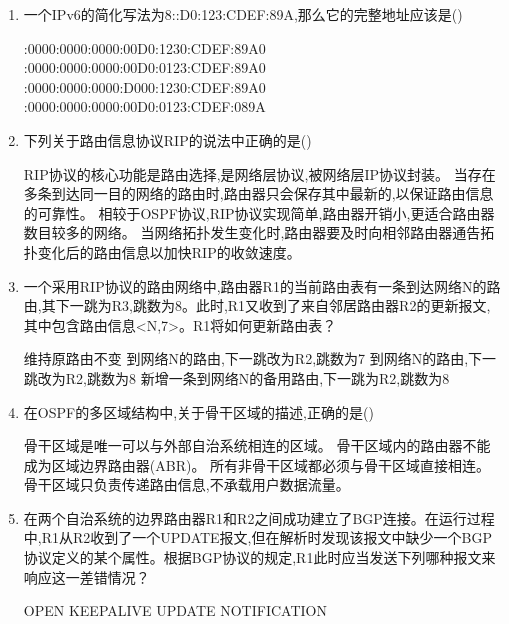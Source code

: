 \documentclass[12pt, a4paper, oneside, UTF8]{ctexbook}
\begin{document}
\begin{enumerate}
    \item 一个IPv6的简化写法为8::D0:123:CDEF:89A,那么它的完整地址应该是()
    \begin{choices}[1]
    :0000:0000:0000:00D0:1230:CDEF:89A0
    :0000:0000:0000:00D0:0123:CDEF:89A0
    :0000:0000:0000:D000:1230:CDEF:89A0
    :0000:0000:0000:00D0:0123:CDEF:089A
    \end{choices}

    \item 下列关于路由信息协议RIP的说法中正确的是(\qquad)
    \begin{choices}[1]
    \task RIP协议的核心功能是路由选择,是网络层协议,被网络层IP协议封装。
    \task 当存在多条到达同一目的网络的路由时,路由器只会保存其中最新的,以保证路由信息的可靠性。
    \task 相较于OSPF协议,RIP协议实现简单,路由器开销小,更适合路由器数目较多的网络。
    \task 当网络拓扑发生变化时,路由器要及时向相邻路由器通告拓扑变化后的路由信息以加快RIP的收敛速度。
    \end{choices}

    \item 一个采用RIP协议的路由网络中,路由器R1的当前路由表有一条到达网络N的路由,其下一跳为R3,跳数为8。此时,R1又收到了来自邻居路由器R2的更新报文,其中包含路由信息<N,7>。R1将如何更新路由表？
    \begin{choices}[1]
    \task 维持原路由不变
    \task 到网络N的路由,下一跳改为R2,跳数为7
    \task 到网络N的路由,下一跳改为R2,跳数为8
    \task 新增一条到网络N的备用路由,下一跳为R2,跳数为8
    \end{choices}

    \item 在OSPF的多区域结构中,关于骨干区域的描述,正确的是(\qquad)
    \begin{choices}[1]
    \task 骨干区域是唯一可以与外部自治系统相连的区域。
    \task 骨干区域内的路由器不能成为区域边界路由器(ABR)。
    \task 所有非骨干区域都必须与骨干区域直接相连。
    \task 骨干区域只负责传递路由信息,不承载用户数据流量。
    \end{choices}

    \item 在两个自治系统的边界路由器R1和R2之间成功建立了BGP连接。在运行过程中,R1从R2收到了一个UPDATE报文,但在解析时发现该报文中缺少一个BGP协议定义的某个属性。根据BGP协议的规定,R1此时应当发送下列哪种报文来响应这一差错情况？
    \begin{choices}[1]
    \task OPEN
    \task KEEPALIVE
    \task UPDATE
    \task NOTIFICATION
    \end{choices}


\end{enumerate}
\end{document}

